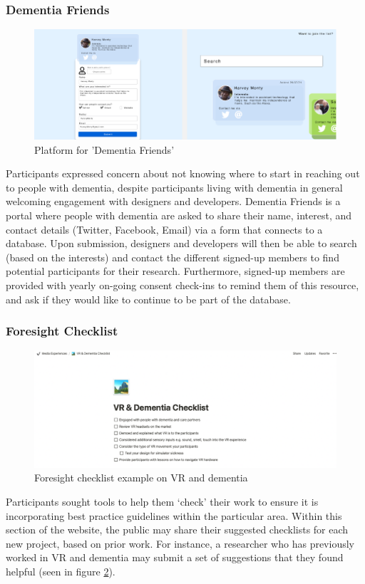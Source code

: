 \subsubsection{Dementia Friends}
\begin{figure}[h]
\centering
\includegraphics[width=1\linewidth]{Images/D3Toolkit/Fig6.png}
\caption{Platform for 'Dementia Friends'}
\label{fig:DementiaFriends}
\end{figure}
Participants expressed concern about not knowing where to start in reaching out to people with dementia, despite participants living with dementia in general welcoming engagement with designers and developers. Dementia Friends is a portal where people with dementia are asked to share their name, interest, and contact details (Twitter, Facebook, Email) via a form that connects to a database. Upon submission, designers and developers will then be able to search (based on the interests) and contact the different signed-up members to find potential participants for their research. Furthermore, signed-up members are provided with yearly on-going consent check-ins to remind them of this resource, and ask if they would like to continue to be part of the database.

\subsubsection{Foresight Checklist}
\begin{figure}[h]
\centering
\includegraphics[width=1\linewidth]{Images/D3Toolkit/Fig7.png}
\caption{Foresight checklist example on VR and dementia}
\label{fig:ForesightChecklist}
\end{figure}
Participants sought tools to help them ‘check’ their work to ensure it is incorporating best practice guidelines within the particular area. Within this section of the website, the public may share their suggested checklists for each new project, based on prior work. For instance, a researcher who has previously worked in VR and dementia may submit a set of suggestions that they found helpful (seen in figure \ref{fig:ForesightChecklist}).

